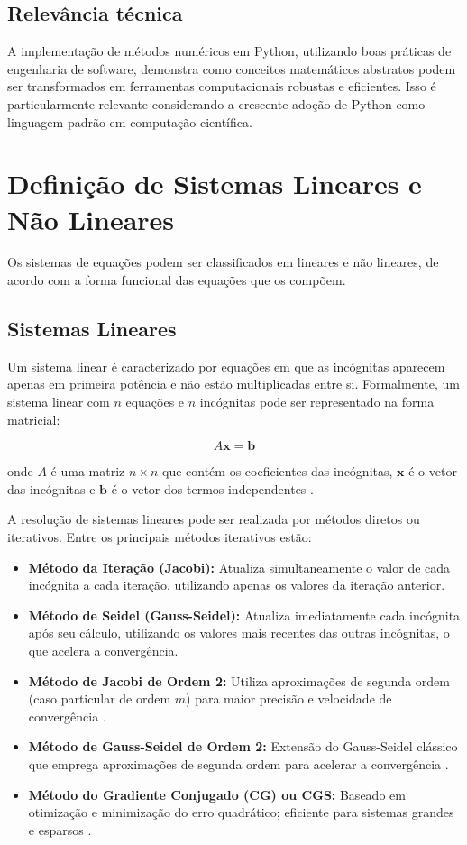 \documentclass[12pt,a4paper]{article}
\begin{document}
\subsection{Relevância técnica}
A implementação de métodos numéricos em Python, utilizando boas práticas de engenharia de software, demonstra como conceitos matemáticos abstratos podem ser transformados em ferramentas computacionais robustas e eficientes. Isso é particularmente relevante considerando a crescente adoção de Python como linguagem padrão em computação científica.




\newpage

\section{Definição de Sistemas Lineares e Não Lineares}

Os sistemas de equações podem ser classificados em lineares e não lineares, de acordo com a forma funcional das equações que os compõem.

\subsection{Sistemas Lineares}

Um sistema linear é caracterizado por equações em que as incógnitas aparecem apenas em primeira potência e não estão multiplicadas entre si. Formalmente, um sistema linear com $n$ equações e $n$ incógnitas pode ser representado na forma matricial:

\[
A\mathbf{x} = \mathbf{b}
\]

onde $A$ é uma matriz $n \times n$ que contém os coeficientes das incógnitas, $\mathbf{x}$ é o vetor das incógnitas e $\mathbf{b}$ é o vetor dos termos independentes \citep{LEONEL2023}.

A resolução de sistemas lineares pode ser realizada por métodos diretos ou iterativos. Entre os principais métodos iterativos estão:

\begin{itemize}
    \item \textbf{Método da Iteração (Jacobi):} Atualiza simultaneamente o valor de cada incógnita a cada iteração, utilizando apenas os valores da iteração anterior.
    \item \textbf{Método de Seidel (Gauss-Seidel):} Atualiza imediatamente cada incógnita após seu cálculo, utilizando os valores mais recentes das outras incógnitas, o que acelera a convergência.
    \item \textbf{Método de Jacobi de Ordem 2:} Utiliza aproximações de segunda ordem (caso particular de ordem $m$) para maior precisão e velocidade de convergência \citep{ALVAREZ2022}.
    \item \textbf{Método de Gauss-Seidel de Ordem 2:} Extensão do Gauss-Seidel clássico que emprega aproximações de segunda ordem para acelerar a convergência \citep{ALVAREZ2022}.
    \item \textbf{Método do Gradiente Conjugado (CG) ou CGS:} Baseado em otimização e minimização do erro quadrático; eficiente para sistemas grandes e esparsos \citep{SAAD2003}. 
\end{itemize}
\end{document}
